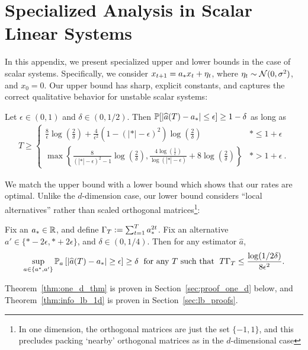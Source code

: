\section{Specialized Analysis in Scalar Linear Systems}
\label{sec:1d_appendix}

In this appendix, we present specialized upper and lower bounds in the case of scalar systems. Specifically, we consider $x_{t+1} = a_{*} x_t + \eta_t$, where $\eta_t \sim \mathcal{N}(0,\sigma^2)$, and $x_0 = 0$. Our upper bound has sharp, explicit constants, and captures the correct qualitative behavior for unstable scalar systems:
\begin{thm}\label{thm:one_d_thm}
Let $\epsilon \in (0,1)$ and $\delta \in (0, 1/2)$. Then $\mathbb{P}[|\widehat{a}(T) - a_{*} | \leq \epsilon] \ge 1-\delta$ as long as
\begin{align*}
T \geq \begin{cases}\frac{8}{\epsilon}\log\left(\frac{2}{\delta}\right) + \frac{4}{\epsilon^2}(1 - (|\ast| - \epsilon)^2)\log\left(\frac{2}{\delta}\right) & \ast \le 1 + \epsilon \\
\max\left\{\frac{8}{(|\ast| - \epsilon)^2 - 1}\log\left(\frac{2}{\delta}\right), \frac{4\log(\frac{1}{\epsilon})}{\log(|\ast| - \epsilon)} + 8\log\left(\frac{2}{\delta}\right)\right\} & \ast > 1 + \epsilon~.
\end{cases}
\end{align*}
\end{thm}
We match the upper bound with a lower bound which shows that our rates are optimal. Unlike the $d$-dimension case, our lower bound considers ``local alternatives'' rather than scaled orthogonal matrices\footnote{In one dimension, the orthogonal matrices are just the set $\{-1,1\}$, and this precludes packing `nearby' orthogonal matrices as in the $d$-dimensional case}:
\begin{thm}\label{thm:info_lb_1d}  Fix an $a_{*} \in \mathbb{R}$, and define $\Gamma_T := \sum_{t=1}^{T}a_{*}^{2t}$. Fix an alternative $a' \in \{\ast - 2\epsilon,\ast + 2\epsilon\}$, and $\delta \in (0,1/4)$. Then for any estimator $\widehat{a}$,
\begin{eqnarray*}
\sup_{a \in \{a^*,a'\}}\mathbb{P}_{a}\left[\left|\widehat{a}(T) - a_{*}\right| \ge \epsilon\right] \ge \delta \; \text{ for any } T \text{ such that }\; T \Gamma_T \le \frac{\log (1/2\delta)}{8\epsilon^2}. 
\end{eqnarray*}
\end{thm}
Theorem~\ref{thm:one_d_thm} is proven in Section~\ref{sec:proof_one_d} below, and Theorem~\ref{thm:info_lb_1d} is proven in Section~\ref{sec:lb_proofs}.

